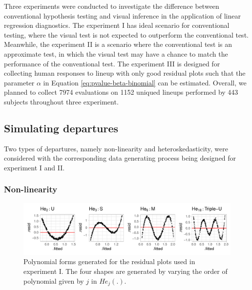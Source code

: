 \documentclass[]{interact}
\theoremstyle{plain}%
\theoremstyle{definition}
\theoremstyle{remark}
\begin{document}
Three experiments were conducted to investigate the difference between
conventional hypothesis testing and visual inference in the application
of linear regression diagnostics. The experiment I has ideal scenario
for conventional testing, where the visual test is not expected to
outperform the conventional test. Meanwhile, the experiment II is a
scenario where the conventional test is an approximate test, in which
the visual test may have a chance to match the performance of the
conventional test. The experiment III is designed for collecting human
responses to lineup with only good residual plots such that the
parameter \(\alpha\) in Equation \ref{eq:pvalue-beta-binomial} can be
estimated. Overall, we planned to collect 7974 evaluations on 1152
uniqued lineups performed by 443 subjects throughout three experiment.

\hypertarget{simulating-departures}{%
\subsection{Simulating departures}\label{simulating-departures}}

Two types of departures, namely non-linearity and heteroskedasticity,
were considered with the corresponding data generating process being
designed for experiment I and II.

\hypertarget{non-linearity}{%
\subsubsection{Non-linearity}\label{non-linearity}}

\begin{figure}

{\centering \includegraphics[width=1\linewidth]{paper_comparison_files/figure-latex/different-shape-of-herimite-1} 

}

\caption{Polynomial forms generated for the residual plots used in experiment I. The four shapes are generated by varying the order of polynomial given by $j$ in $He_j(.)$.}\label{fig:different-shape-of-herimite}
\end{figure}
\end{document}
